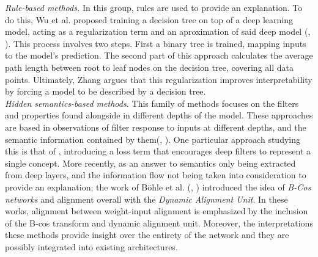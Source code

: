 \noindent \emph{Rule-based methods.} In this group, rules are used to provide an explanation. 
To do this, Wu et al. proposed training a decision tree on top of a deep learning model, acting as 
a regularization term and an aproximation of said deep model (\cite{wu2018beyond}, 
\cite{wu2020regional}). This process involves two steps. First a binary tree is trained, mapping 
inputs to the model's prediction. The second part of this approach calculates the average path 
length between root to leaf nodes on the decision tree, covering all data points. Ultimately, Zhang 
argues that this regularization improves interpretability by forcing a model to be described by a 
decision tree.\\

\noindent \emph{Hidden semantics-based methods.} This family of methods focuses on the filters 
and properties found alongside in different depths of the model. These approaches are based in 
observations of filter response to inputs at different depths, and the semantic information 
contained by them(\cite{bau2017network}, \cite{zhou2018interpreting}). 
One particular approach studying this is that of \autocite{zhang2018interpretable}, introducing a 
loss term that encourages deep filters to represent a single concept. More recently, as an answer to 
semantics only being extracted from deep layers, and the information flow not being taken into 
consideration to provide an explanation; the work of B\"ohle et al. (\cite{bohle2022b}, 
\cite{bohle2024b}) introduced the idea of \emph{B-Cos networks} and alignment overall with the 
\emph{Dynamic Alignment Unit}. In these works, alignment between weight-input alignment is 
emphasized by the inclusion of the B-cos transform and dynamic alignment unit. Moreover, the 
interpretations these methods provide insight over the entirety of the network and they are 
possibly integrated into existing architectures.\\

